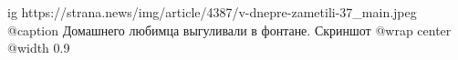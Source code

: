  
 
 
 
 

\ifcmt
  ig https://strana.news/img/article/4387/v-dnepre-zametili-37_main.jpeg
	@caption Домашнего любимца выгуливали в фонтане. Скриншот
  @wrap center
  @width 0.9
\fi
